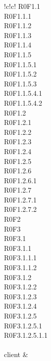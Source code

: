\begin{tabella}{!{\VRule}c!{\VRule}c!{\VRule}}
{					R0F1.1 \\
					R0F1.1.1 \\
					R0F1.1.2 \\
					R0F1.1.3 \\
					R0F1.1.4 \\
					R0F1.1.5 \\ 
					R0F1.1.5.1 \\
					R0F1.1.5.2 \\
					R0F1.1.5.3 \\
					R0F1.1.5.4.1 \\
					R0F1.1.5.4.2 \\
					R0F1.2 \\
					R0F1.2.1 \\
					R0F1.2.2 \\
					R0F1.2.3 \\
					R0F1.2.4 \\ 
					R0F1.2.5 \\
					R0F1.2.6 \\
					R0F1.2.6.1 \\
					R0F1.2.7 \\
					R0F1.2.7.1 \\ 
					R0F1.2.7.2 \\
					R0F2 \\
					R0F3 \\
					R0F3.1 \\
					R0F3.1.1 \\
					R0F3.1.1.1 \\
					R0F3.1.1.2 \\
					R0F3.1.2 \\
					R0F3.1.2.2 \\
					R0F3.1.2.3 \\
					R0F3.1.2.4 \\
					R0F3.1.2.5 \\
					R0F3.1.2.5.1 \\
					R0F3.1.2.5.1.1 \\
					
				} \\
				
	client & \cellacaporiga{
					
}
\end{tabella}
